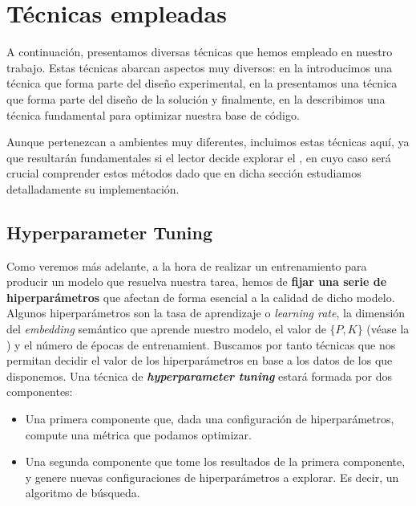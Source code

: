 \section{Técnicas empleadas}

A continuación, presentamos diversas técnicas que hemos empleado en nuestro trabajo. Estas técnicas abarcan aspectos muy diversos: en la  introducimos una técnica que forma parte del diseño experimental, en la  presentamos una técnica que forma parte del diseño de la solución y finalmente, en la  describimos una técnica fundamental para optimizar nuestra base de código.

Aunque pertenezcan a ambientes muy diferentes, incluimos estas técnicas aquí, ya que resultarán fundamentales si el lector decide explorar el , en cuyo caso será crucial comprender estos métodos dado que en dicha sección estudiamos detalladamente su implementación.

\subsection{Hyperparameter Tuning} \label{isec:hptuning_kfold_cross_validation}

Como veremos más adelante, a la hora de realizar un entrenamiento para producir un modelo que resuelva nuestra tarea, hemos de \textbf{fijar una serie de hiperparámetros} que afectan de forma esencial a la calidad de dicho modelo. Algunos hiperparámetros son la tasa de aprendizaje o \textit{learning rate}, la dimensión del \textit{embedding} semántico que aprende nuestro modelo, el valor de $\{P, K\}$ (véase la ) y el número de épocas de entrenamient. Buscamos por tanto técnicas que nos permitan decidir el valor de los hiperparámetros en base a los datos de los que disponemos. Una técnica de \textbf{\textit{hyperparameter tuning}} estará formada por dos componentes:

\begin{itemize}
    \item Una primera componente que, dada una configuración de hiperparámetros, compute una métrica que podamos optimizar.
    \item Una segunda componente que tome los resultados de la primera componente, y genere nuevas configuraciones de hiperparámetros a explorar. Es decir, un algoritmo de búsqueda.
\end{itemize}

